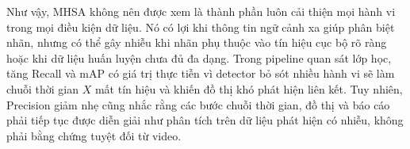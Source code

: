 Như vậy, MHSA không nên được xem là thành phần luôn cải thiện mọi hành vi trong mọi điều kiện dữ liệu. Nó có lợi khi thông tin ngữ cảnh xa giúp phân biệt nhãn, nhưng có thể gây nhiễu khi nhãn phụ thuộc vào tín hiệu cục bộ rõ ràng hoặc khi dữ liệu huấn luyện chưa đủ đa dạng. Trong pipeline quan sát lớp học, tăng Recall và mAP có giá trị thực tiễn vì detector bỏ sót nhiều hành vi sẽ làm chuỗi thời gian \(X\) mất tín hiệu và khiến đồ thị khó phát hiện liên kết. Tuy nhiên, Precision giảm nhẹ cũng nhắc rằng các bước chuỗi thời gian, đồ thị và báo cáo phải tiếp tục được diễn giải như phân tích trên dữ liệu phát hiện có nhiễu, không phải bằng chứng tuyệt đối từ video.
